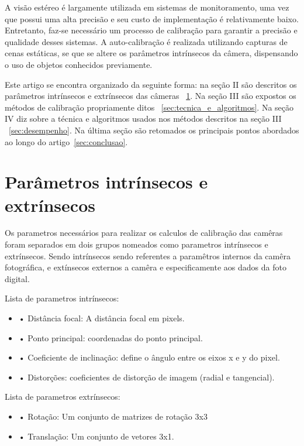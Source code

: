 \documentclass[portuguese]{sbrt}
\begin{document}
\newline
A visão estéreo é largamente utilizada em sistemas de monitoramento, uma vez que possui uma alta precisão e seu custo de implementação é relativamente baixo. Entretanto, faz-se necessário um processo de calibração para garantir a precisão e qualidade desses sistemas. A auto-calibração é realizada utilizando capturas de cenas estáticas, se que se altere os parâmetros intrínsecos da câmera, dispensando o uso de objetos conhecidos previamente.

\newline
Este artigo se encontra organizado da seguinte forma: na seção II são descritos os parâmetros intrínsecos e extrínsecos das câmeras ~\ref{sec:parametros}. Na seção III são expostos os métodos de calibração propriamente ditos ~\ref{sec:tecnica_e_algoritmos}. Na seção IV diz sobre a técnica e algoritmos usados nos métodos descritos na seção III ~\ref{sec:desempenho}. Na última seção são retomados os principais pontos abordados ao longo do artigo~\ref{sec:conclusao}.
 

\section{Parâmetros intrínsecos e extrínsecos}
\label{sec:parametros}
Os parametros necessários para realizar os calculos de calibração das camêras foram separados em dois grupos nomeados como parametros intrínsecos e extrínsecos. Sendo intrínsecos sendo referentes a paramêtros internos da camêra fotográfica, e extínsecos externos a camêra e especificamente aos dados da foto digital.

\newline
Lista de parametros intrínsecos:
\begin{itemize}
  \item • Distância focal: A distância focal em pixels.
  \item • Ponto principal: coordenadas do ponto principal.
  \item • Coeficiente de inclinação: define o ângulo entre os eixos x e y do pixel.
  \item • Distorções: coeficientes de distorção de imagem (radial e tangencial).
\end{itemize}

\newline
Lista de parametros extrínsecos:
\begin{itemize}
    \item • Rotação: Um conjunto de matrizes de rotação 3x3
    \item • Translação: Um conjunto de vetores 3x1.
\end{itemize}
\end{document}
